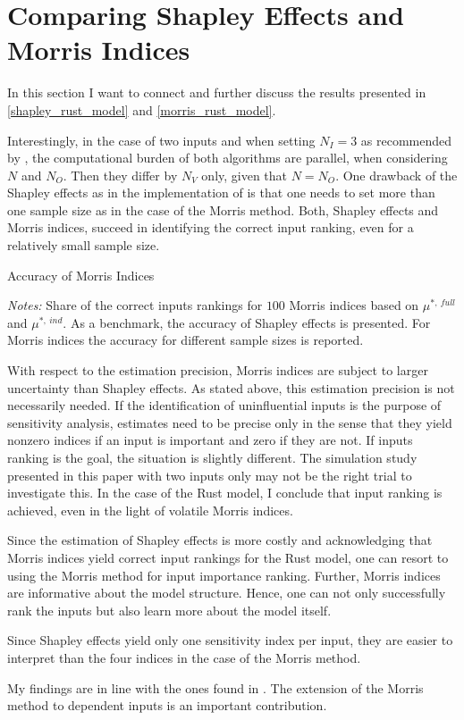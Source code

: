\section{Comparing Shapley Effects and Morris Indices} \label{comparison}

In this section I want to connect and further discuss the results presented in \cref{shapley_rust_model}
and \cref{morris_rust_model}.

Interestingly, in the case of two inputs and when setting $N_I = 3$ as recommended
by \citet{SNS16}, the computational burden of both algorithms are parallel, when
considering $N$ and $N_O$. Then they differ by $N_V$ only, given that $N = N_O$. One drawback
of the Shapley effects as in the implementation of \citet{SNS16} is that one needs to
set more than one sample size as in the case of the Morris method.
Both, Shapley effects and Morris indices, succeed in identifying the correct input
ranking, even for a relatively small sample size.

\begin{table}
	\centering
	\caption{Accuracy of Morris Indices}
	\label{cov}
	\begin{threeparttable}
	\centering
	
	\begin{tablenotes}
	\small
	\item \textit{Notes:} Share of the correct inputs rankings for $100$ Morris indices based on $\mu^{\ast,\ full}$ and $\mu^{\ast,\ ind}$. As a benchmark, the accuracy of Shapley effects is presented. For Morris indices the accuracy for different sample sizes is reported.
	\end{tablenotes}
	\end{threeparttable}
\end{table}

With respect to the estimation precision, Morris indices are subject to larger uncertainty
than Shapley effects. As stated above, this estimation precision is not necessarily needed. If
the identification of uninfluential inputs is the purpose of sensitivity analysis, estimates need to be precise
only in the sense that they yield nonzero indices if an input is important and zero if they
are not. If inputs ranking is the goal, the situation is slightly different. The simulation
study presented in this paper with two inputs only may not be the right trial to investigate
this. In the case of the Rust model, I conclude that input ranking is achieved, even in the
light of volatile Morris indices.

Since the estimation of Shapley effects is more costly and acknowledging that Morris
indices yield correct input rankings for the Rust model, one can resort to using the Morris
method for input importance ranking. Further, Morris indices are informative about the
model structure. Hence, one can not only successfully rank the inputs but also learn more
about the model itself.

Since Shapley effects yield only one sensitivity index per input, they are easier to interpret than the four indices in the case of the Morris method.

My findings are in line with the ones found in \citet{GM17}. The extension of the Morris method to dependent inputs is an important contribution.